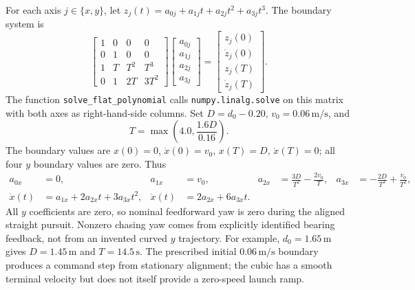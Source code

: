 \documentclass[11pt,a4paper]{article}
\begin{document}
For each axis $j\in\{x,y\}$, let $z_j(t)=a_{0j}+a_{1j}t+a_{2j}t^2+a_{3j}t^3$. The boundary system is
\begin{equation}
\begin{bmatrix}1&0&0&0\\0&1&0&0\\1&T&T^2&T^3\\0&1&2T&3T^2\end{bmatrix}
\begin{bmatrix}a_{0j}\\a_{1j}\\a_{2j}\\a_{3j}\end{bmatrix}
=\begin{bmatrix}z_j(0)\\\dot z_j(0)\\z_j(T)\\\dot z_j(T)\end{bmatrix}.
\end{equation}
The function \texttt{solve\_flat\_polynomial} calls \texttt{numpy.linalg.solve} on this matrix with both axes as right-hand-side columns. Set $D=d_0-0.20$, $v_0=0.06\,\mathrm{m/s}$, and
\begin{equation}
 T=\max\left(4.0,\frac{1.6D}{0.16}\right).
\end{equation}
The boundary values are $x(0)=0$, $\dot{x}(0)=v_0$, $x(T)=D$, $\dot{x}(T)=0$; all four $y$ boundary values are zero. Thus
\begin{align}
 a_{0x}&=0,&a_{1x}&=v_0,&
 a_{2x}&=\frac{3D}{T^2}-\frac{2v_0}{T},&
 a_{3x}&=-\frac{2D}{T^3}+\frac{v_0}{T^2},\\
 \dot{x}(t)&=a_{1x}+2a_{2x}t+3a_{3x}t^2,&
 \ddot{x}(t)&=2a_{2x}+6a_{3x}t.
\end{align}
All $y$ coefficients are zero, so nominal feedforward yaw is zero during the aligned straight pursuit. Nonzero chasing yaw comes from explicitly identified bearing feedback, not from an invented curved $y$ trajectory. For example, $d_0=1.65\,\mathrm{m}$ gives $D=1.45\,\mathrm{m}$ and $T=14.5\,\mathrm{s}$. The prescribed initial $0.06\,\mathrm{m/s}$ boundary produces a command step from stationary alignment; the cubic has a smooth terminal velocity but does not itself provide a zero-speed launch ramp.
\end{document}
